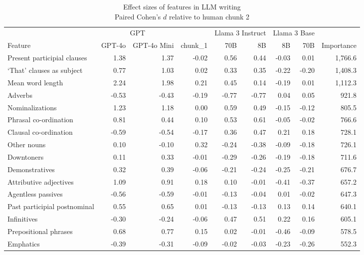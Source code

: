 \begin{table}[!t]
\caption*{
{\large Effect sizes of features in LLM writing} \\ 
{\small Paired Cohen's \(d\) relative to human chunk 2}
} 
\fontsize{12.0pt}{14.4pt}\selectfont
\begin{tabular*}{\linewidth}{@{\extracolsep{\fill}}lrrrrrrrr}
\toprule
 & \multicolumn{2}{c}{GPT} &  & \multicolumn{2}{c}{Llama 3 Instruct} & \multicolumn{2}{c}{Llama 3 Base} &  \\ 
\cmidrule(lr){2-3} \cmidrule(lr){5-6} \cmidrule(lr){7-8}
Feature & GPT-4o & GPT-4o Mini & chunk\_1 & 70B & 8B & 8B & 70B & Importance \\ 
\midrule\addlinespace[2.5pt]
Present participial clauses & 1.38 & 1.37 & -0.02 & 0.56 & 0.44 & -0.03 & 0.01 & 1,766.6 \\ 
‘That’ clauses as subject & 0.77 & 1.03 & 0.02 & 0.33 & 0.35 & -0.22 & -0.20 & 1,408.3 \\ 
Mean word length & 2.24 & 1.98 & 0.21 & 0.45 & 0.14 & -0.19 & 0.01 & 1,112.3 \\ 
Adverbs & -0.53 & -0.43 & -0.19 & -0.77 & -0.77 & 0.04 & 0.05 & 921.8 \\ 
Nominalizations & 1.23 & 1.18 & 0.00 & 0.59 & 0.49 & -0.15 & -0.12 & 805.5 \\ 
Phrasal co-ordination & 0.81 & 0.44 & 0.10 & 0.53 & 0.61 & -0.05 & -0.02 & 766.6 \\ 
Clausal co-ordination & -0.59 & -0.54 & -0.17 & 0.36 & 0.47 & 0.21 & 0.18 & 728.1 \\ 
Other nouns & 0.10 & -0.10 & 0.32 & -0.24 & -0.38 & -0.09 & -0.18 & 726.1 \\ 
Downtoners & 0.11 & 0.33 & -0.01 & -0.29 & -0.26 & -0.19 & -0.18 & 711.6 \\ 
Demonstratives & 0.32 & 0.39 & -0.06 & -0.21 & -0.24 & -0.25 & -0.21 & 676.7 \\ 
Attributive adjectives & 1.09 & 0.91 & 0.18 & 0.10 & -0.01 & -0.41 & -0.37 & 657.2 \\ 
Agentless passives & -0.56 & -0.59 & -0.01 & -0.13 & -0.04 & 0.01 & -0.02 & 647.3 \\ 
Past participial postnominal & 0.55 & 0.65 & 0.01 & -0.13 & -0.13 & 0.13 & 0.14 & 640.1 \\ 
Infinitives & -0.30 & -0.24 & -0.06 & 0.47 & 0.51 & 0.22 & 0.16 & 605.1 \\ 
Prepositional phrases & 0.68 & 0.77 & 0.15 & 0.02 & -0.01 & -0.46 & -0.09 & 578.5 \\ 
Emphatics & -0.39 & -0.31 & -0.09 & -0.02 & -0.03 & -0.23 & -0.26 & 552.3 \\ 

\end{tabular*}
\end{table}

